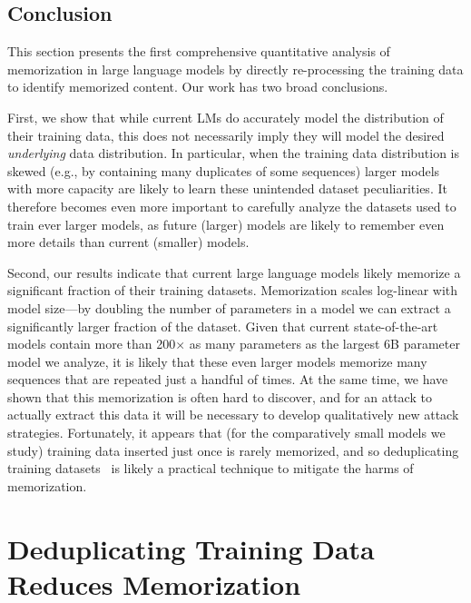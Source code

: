 \subsection{Conclusion}

%
This section presents the first comprehensive quantitative analysis of memorization in
large language models by directly re-processing the training data to identify memorized content.
%
Our work has two broad conclusions.

First, we show that while current LMs do accurately model the distribution of their training data, this does not necessarily imply they will model the desired \emph{underlying} data distribution.
In particular, when the training data distribution is skewed (e.g., by containing many duplicates of some sequences) larger models with more capacity are likely to learn these unintended dataset peculiarities.
%
It therefore becomes even more important to carefully analyze the datasets used to train ever larger models, as future (larger) models are likely to remember even more details than current (smaller) models.


Second, our results indicate that current large language models likely memorize a significant fraction of their training datasets.
%
Memorization scales log-linear with model size---by doubling the number of parameters in a model we can extract a significantly larger fraction of the dataset.
%
Given that current state-of-the-art models contain more than 200$\times$ as many parameters as the largest 6B parameter model we analyze, it is likely that these even larger models memorize many sequences that are repeated just a handful of times.
%
At the same time, we have shown that this memorization is often hard to discover, and for an attack to actually extract this data it will be necessary to develop qualitatively new attack strategies.
%
Fortunately, it appears that (for the comparatively small models we study) training data inserted just once is rarely memorized, and so deduplicating training datasets~\citep{lee2021deduplicating} is likely a practical technique to mitigate the harms of memorization.


\section{Deduplicating Training Data Reduces Memorization}
\label{section:dedup}

